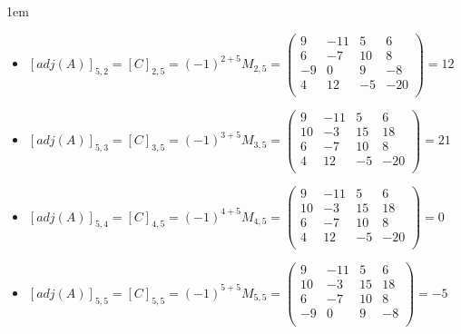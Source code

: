 \documentclass[12pt, fleqn]{article}                             %
\newenvironment{SmallIndentation}[1][0.75em]                    %
        {\begin{adjustwidth}{#1}{}\begin{footnotesize}}             %
        {\end{footnotesize}\end{adjustwidth}}                       %
\theoremstyle{break}                                            %
\newcommand{\pVector}[1]                                        %
        { \ensuremath{\begin{pmatrix}#1\end{pmatrix}} }             %
\begin{document}
\begin{itemize}
\begin{SmallIndentation}[1em]
\begin{itemize}
                    \item
                        $[adj(A)]_{5, 2} 
                            = [C]_{2, 5} 
                            = (-1)^{2+5} M_{2, 5}
                            = \pVector{
                                    9  & -11 & 5  & 6   \\
                                    6  & -7  & 10 & 8   \\
                                    -9 & 0   & 9  & -8  \\
                                    4  & 12  & -5 & -20 \\
                                }
                            = 12$

                    \item
                        $[adj(A)]_{5, 3} 
                            = [C]_{3, 5} 
                            = (-1)^{3+5} M_{3, 5}
                            = \pVector{
                                    9  & -11 & 5  & 6   \\
                                    10 & -3  & 15 & 18  \\
                                    6  & -7  & 10 & 8   \\
                                    4  & 12  & -5 & -20 \\
                                }
                            = 21$

                    \item
                        $[adj(A)]_{5, 4} 
                            = [C]_{4, 5} 
                            = (-1)^{4+5} M_{4, 5}
                            = \pVector{
                                    9  & -11 & 5  & 6   \\
                                    10 & -3  & 15 & 18  \\
                                    6  & -7  & 10 & 8   \\
                                    4  & 12  & -5 & -20 \\
                                }
                            = 0$

                    \item
                        $[adj(A)]_{5, 5} 
                            = [C]_{5, 5} 
                            = (-1)^{5+5} M_{5, 5}
                            = \pVector{
                                    9  & -11 & 5  & 6  \\
                                    10 & -3  & 15 & 18 \\
                                    6  & -7  & 10 & 8  \\
                                    -9 & 0   & 9  & -8 \\
                                }
                            = -5$


\end{itemize}
\end{SmallIndentation}
\end{itemize}
\end{document}
